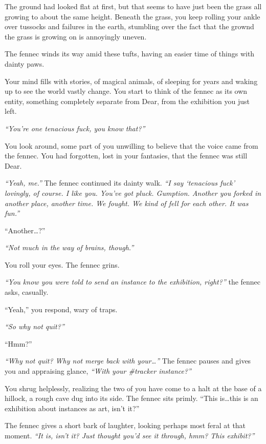 The ground had looked flat at first, but that seems to have just been the grass all growing to about the same height. Beneath the grass, you keep rolling your ankle over tussocks and failures in the earth, stumbling over the fact that the grownd the grass is growing on is annoyingly uneven.

The fennec winds its way amid these tufts, having an easier time of things with dainty paws.

Your mind fills with stories, of magical animals, of sleeping for years and waking up to see the world vastly change. You start to think of the fennec as its own entity, something completely separate from Dear, from the exhibition you just left.

\emph{``You're one tenacious fuck, you know that?''}

You look around, some part of you unwilling to believe that the voice came from the fennec. You had forgotten, lost in your fantasies, that the fennec was still Dear.

\emph{``Yeah, me.''} The fennec continued its dainty walk. \emph{``I say `tenacious fuck' lovingly, of course. I like you. You've got pluck. Gumption. Another you forked in another place, another time. We fought. We kind of fell for each other. It was fun.''}

``Another\ldots{}?''

\emph{``Not much in the way of brains, though.''}

You roll your eyes. The fennec grins.

\emph{``You know you were told to send an instance to the exhibition, right?''} the fennec asks, casually.

``Yeah,'' you respond, wary of traps.

\emph{``So why not quit?''}

``Hmm?''

\emph{``Why not quit? Why not merge back with your\ldots{}''} The fennec pauses and gives you and appraising glance, \emph{``With your \#tracker instance?''}

You shrug helplessly, realizing the two of you have come to a halt at the base of a hillock, a rough cave dug into its side. The fennec sits primly. ``This is\ldots{}this is an exhibition about instances as art, isn't it?''

The fennec gives a short bark of laughter, looking perhaps most feral at that moment. \emph{``It is, isn't it? Just thought you'd see it through, hmm? This exhibit?''}


